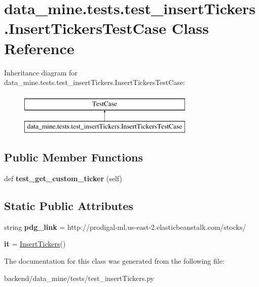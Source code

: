\hypertarget{classdata__mine_1_1tests_1_1test__insert_tickers_1_1_insert_tickers_test_case}{}\section{data\+\_\+mine.\+tests.\+test\+\_\+insert\+Tickers.\+Insert\+Tickers\+Test\+Case Class Reference}
\label{classdata__mine_1_1tests_1_1test__insert_tickers_1_1_insert_tickers_test_case}
Inheritance diagram for data\+\_\+mine.\+tests.\+test\+\_\+insert\+Tickers.\+Insert\+Tickers\+Test\+Case\+:\begin{figure}[H]
\begin{center}
\leavevmode
\includegraphics[height=2.000000cm]{classdata__mine_1_1tests_1_1test__insert_tickers_1_1_insert_tickers_test_case}
\end{center}
\end{figure}
\subsection*{Public Member Functions}
\begin{DoxyCompactItemize}
\item 
\mbox{\label{classdata__mine_1_1tests_1_1test__insert_tickers_1_1_insert_tickers_test_case_ae5d0c297cb83611a4343f9872a8c7b82}} 
def {\bfseries test\+\_\+get\+\_\+custom\+\_\+ticker} (self)
\end{DoxyCompactItemize}
\subsection*{Static Public Attributes}
\begin{DoxyCompactItemize}
\item 
\mbox{\label{classdata__mine_1_1tests_1_1test__insert_tickers_1_1_insert_tickers_test_case_a3f8b8b39f7e4db787ecaf064c8ca2c00}} 
string {\bfseries pdg\+\_\+link} = \textquotesingle{}http\+://prodigal-\/ml.\+us-\/east-\/2.elasticbeanstalk.\+com/stocks/\textquotesingle{}
\item 
\mbox{\label{classdata__mine_1_1tests_1_1test__insert_tickers_1_1_insert_tickers_test_case_ab725e74096b9511abf7694c7e830513c}} 
{\bfseries it} = \mbox{\hyperlink{classdata__mine_1_1_insert_tickers_1_1_insert_tickers}{Insert\+Tickers}}()
\end{DoxyCompactItemize}


The documentation for this class was generated from the following file\+:\begin{DoxyCompactItemize}
\item 
backend/data\+\_\+mine/tests/test\+\_\+insert\+Tickers.\+py\end{DoxyCompactItemize}

